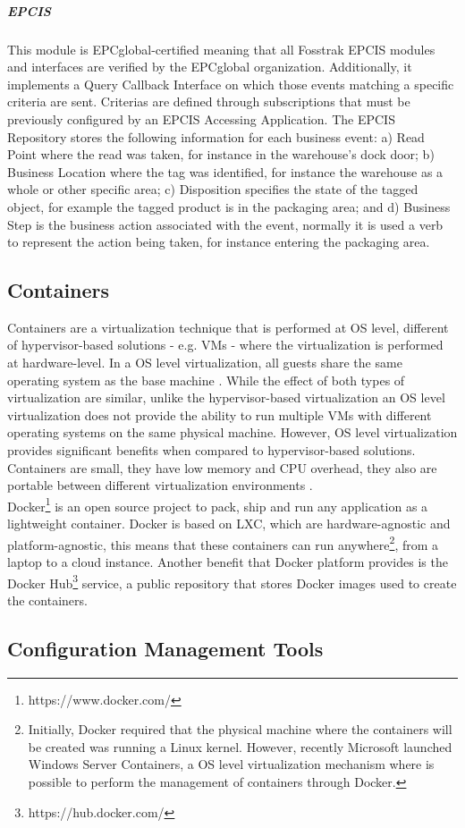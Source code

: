 \subparagraph{EPCIS}
This module is EPCglobal-certified meaning that all Fosstrak EPCIS modules and interfaces are
verified by the EPCglobal organization. Additionally, it implements a Query Callback Interface on which
those events matching a specific criteria are sent. Criterias are defined through subscriptions that
must be previously configured by an EPCIS Accessing Application. The EPCIS Repository stores the following
information for each business event: a) Read Point where the read was taken, for instance in the warehouse’s
dock door; b) Business Location where the tag was identified, for instance the warehouse as a whole or other
specific area; c) Disposition specifies the state of the tagged object, for example the tagged product is
in the packaging area; and d) Business Step is the business action associated with the event, normally it
is used a verb to represent the action being taken, for instance entering the packaging area.

\subsection{Containers}
\label{sub:containers}
Containers are a virtualization technique that is performed at \gls{OS} level, different of
hypervisor-based solutions - e.g. \glspl{VM} - where the virtualization is performed at hardware-level.
In a \gls{OS} level virtualization, all guests share the same operating system as the base machine \cite{matthews2007quantifying}.
While the effect of both types of virtualization are similar, unlike the hypervisor-based virtualization
an \gls{OS} level virtualization does not provide the ability to run multiple \glspl{VM} with different
operating systems on the same physical machine. However, \gls{OS} level virtualization provides significant
benefits when compared to hypervisor-based solutions. Containers are small, they have low memory and
\gls{CPU} overhead, they also are portable between different virtualization environments \cite{soltesz2007container}.\\

Docker\footnote{https://www.docker.com/} is an open source project to pack, ship and run any application as
a lightweight container. Docker is based on \gls{LXC}, which are hardware-agnostic and platform-agnostic,
this means that these containers can run anywhere\footnote{Initially, Docker required that the physical
machine where the containers will be created was running a Linux kernel. However, recently Microsoft
launched Windows Server Containers, a \gls{OS} level virtualization mechanism where is possible to
perform the management of containers through Docker.}, from a laptop to a cloud instance. Another
benefit that Docker platform provides is the Docker Hub\footnote{https://hub.docker.com/} service,
a public repository that stores Docker images used to create the containers.

\subsection{Configuration Management Tools}
\label{sub:cm_tools}
